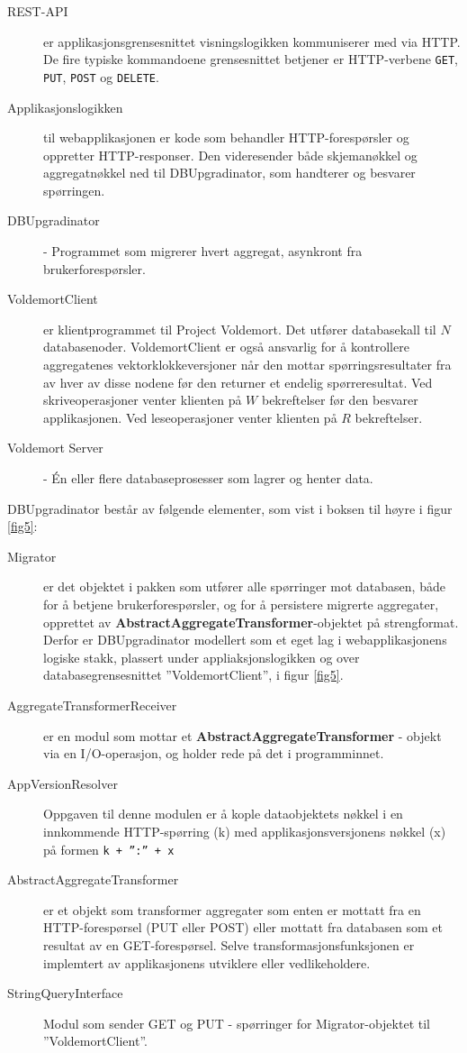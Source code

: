\begin{description}
  \item [REST-API] er applikasjonsgrensesnittet visningslogikken kommuniserer med via HTTP. De fire typiske kommandoene grensesnittet betjener er HTTP-verbene \texttt{GET}, \texttt{PUT}, \texttt{POST} og \texttt{DELETE}.
  \item [Applikasjonslogikken] til webapplikasjonen er kode som behandler HTTP-forespørsler og oppretter HTTP-responser. Den videresender både skjemanøkkel og aggregatnøkkel ned til DBUpgradinator, som handterer og besvarer spørringen.
  \item [DBUpgradinator] - Programmet som migrerer hvert aggregat, asynkront fra brukerforespørsler.
  \item [VoldemortClient] er klientprogrammet til Project Voldemort. Det utfører databasekall til \(N\) databasenoder. VoldemortClient er også ansvarlig for å kontrollere aggregatenes vektorklokke\-versjoner når den mottar spørringsresultater fra av hver av disse nodene før den returner et endelig spørreresultat. Ved skriveoperasjoner venter klienten på \(W\) bekreftelser før den besvarer applikasjonen. Ved leseoperasjoner  venter klienten på \(R\) bekreftelser. 
  \item [Voldemort Server] - Én eller flere databaseprosesser som lagrer og henter data.
\end{description}

DBUpgradinator består av følgende elementer, som vist i boksen til høyre i figur \ref{fig5}:

\begin{description}
  \item [Migrator] er det objektet i pakken som utfører alle spørringer mot databasen, både for å betjene brukerforespørsler, og for å persistere migrerte aggregater, opprettet av \textbf{Abstract}\-\textbf{Aggregate}\-\textbf{Transformer}-objektet på strengformat. Derfor er DBUpgradinator modellert som et eget lag i webapplikasjonens logiske stakk, plassert under appliaksjonslogikken og over databasegrensesnittet ''VoldemortClient'', i figur \ref{fig5}.
  \item [AggregateTransformerReceiver] er en modul som mottar et \textbf{AbstractAggregateTransformer} - objekt via en I/O-operasjon, og holder rede på det i programminnet.
  \item [AppVersionResolver] Oppgaven til denne modulen er å kople dataobjektets nøkkel i en innkommende HTTP-spørring (k) med applikasjonsversjonens nøkkel (x) på formen \texttt{k + '':'' + x}
  \item [AbstractAggregateTransformer] er et objekt som transformer aggregater som enten er mottatt fra en HTTP-forespørsel (PUT eller POST) eller mottatt fra databasen som et resultat av en GET-forespørsel. Selve transformasjonsfunksjonen er implemtert av applikasjonens utviklere eller vedlikeholdere.
  \item [StringQueryInterface] Modul som sender GET og PUT - spørringer for Migrator-objektet til ''VoldemortClient''.
\end{description}

